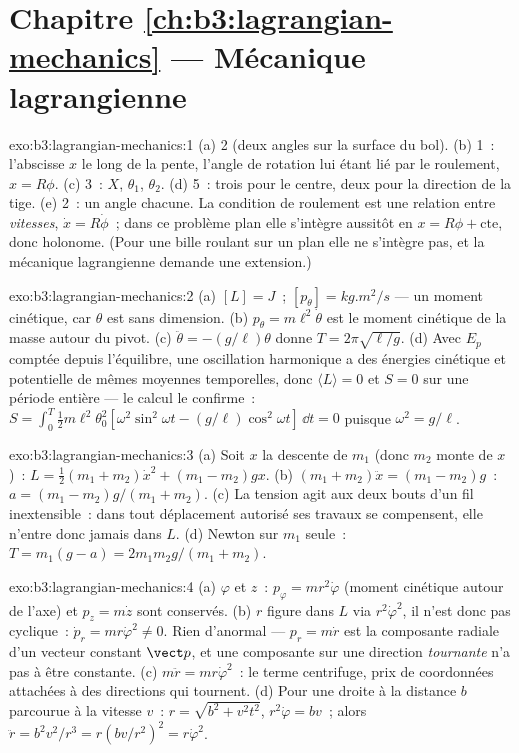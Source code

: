 \section*{Chapitre \ref{ch:b3:lagrangian-mechanics} --- Mécanique lagrangienne}

\begin{solution}{exo:b3:lagrangian-mechanics:1}
(a) 2 (deux angles sur la surface du bol). (b) 1~: l'abscisse $x$ le
long de la pente, l'angle de rotation lui étant lié par le roulement, $x =
R\phi$. (c) 3~: $X$, $\theta_1$, $\theta_2$. (d) 5~: trois pour le
centre, deux pour la direction de la tige. (e) 2~: un angle chacune. La
condition de roulement est une relation entre \emph{vitesses}, $\dot x =
R\dot\phi$~; dans ce problème plan elle s'intègre aussitôt en $x = R\phi +
\text{cte}$, donc holonome. (Pour une bille roulant sur un plan elle ne
s'intègre pas, et la mécanique lagrangienne demande une extension.)
\end{solution}

\begin{solution}{exo:b3:lagrangian-mechanics:2}
(a) $[L] = \unit{J}$~; $[p_\theta] = \unit{kg.m^2/s}$ --- un moment
cinétique, car $\theta$ est sans dimension. (b) $p_\theta =
m\ell^2\dot\theta$ est le moment cinétique de la masse autour du pivot.
(c) $\ddot\theta = -(g/\ell)\theta$ donne $T = 2\pi\sqrt{\ell/g}$. (d)
Avec $E_p$ comptée depuis l'équilibre, une oscillation harmonique a des
énergies cinétique et potentielle de mêmes moyennes temporelles, donc $\langle
L\rangle = 0$ et $S = 0$ sur une période entière --- le calcul le
confirme~: $S = \int_0^T\tfrac12 m\ell^2\theta_0^2[\omega^2\sin^2
\omega t - (g/\ell)\cos^2\omega t]\,\dd t = 0$ puisque $\omega^2 =
g/\ell$.
\end{solution}

\begin{solution}{exo:b3:lagrangian-mechanics:3}
(a) Soit $x$ la descente de $m_1$ (donc $m_2$ monte de $x$)~: $L =
\tfrac12(m_1 + m_2)\dot x^2 + (m_1 - m_2)gx$. (b) $(m_1 + m_2)\ddot x =
(m_1 - m_2)g$~: $a = (m_1 - m_2)g/(m_1 + m_2)$. (c) La tension agit aux
deux bouts d'un fil inextensible~: dans tout déplacement autorisé ses
travaux se compensent, elle n'entre donc jamais dans $L$. (d) Newton sur $m_1$ seule~: $T =
m_1(g - a) = 2m_1m_2g/(m_1 + m_2)$.
\end{solution}

\begin{solution}{exo:b3:lagrangian-mechanics:4}
(a) $\varphi$ et $z$~: $p_\varphi = mr^2\dot\varphi$ (moment cinétique
autour de l'axe) et $p_z = m\dot z$ sont conservés. (b) $r$ figure dans
$L$ via $r^2\dot\varphi^2$, il n'est donc pas cyclique~: $\dot p_r =
mr\dot\varphi^2 \neq 0$. Rien d'anormal --- $p_r = m\dot r$ est la
composante radiale d'un vecteur constant $\vect p$, et une composante sur
une direction \emph{tournante} n'a pas à être constante. (c) $m\ddot r =
mr\dot\varphi^2$~: le terme centrifuge, prix de coordonnées attachées à
des directions qui tournent. (d) Pour une droite à la distance $b$
parcourue à la vitesse $v$~: $r = \sqrt{b^2 + v^2t^2}$, $r^2\dot\varphi = bv$~;
alors $\ddot r = b^2v^2/r^3 = r(bv/r^2)^2 = r\dot\varphi^2$.
\end{solution}

